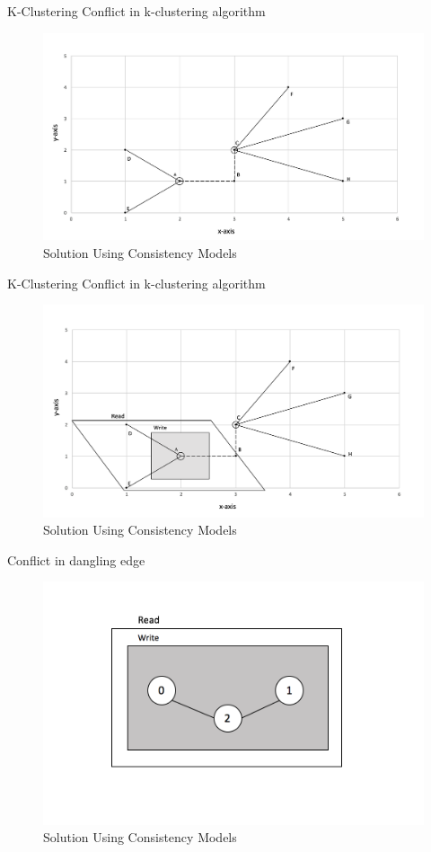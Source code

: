 \begin{frame}{K-Clustering}
	Conflict in k-clustering algorithm
			\begin{figure}
			\includegraphics[width=0.8\linewidth]{figures/kcluster2.jpg}
			\caption{Solution Using Consistency Models}
			\end{figure}
\end{frame}

\begin{frame}{K-Clustering}
	Conflict in k-clustering algorithm
			\begin{figure}
			\includegraphics[width=0.8\linewidth]{figures/kcluster3.png}
			\caption{Solution Using Consistency Models}
			\end{figure}
\end{frame}


\begin{frame}
	Conflict in dangling edge
			\begin{figure}
			\includegraphics[width=0.6\linewidth]{figures/vnode1.png}
			\caption{Solution Using Consistency Models}
			\end{figure}
\end{frame}
